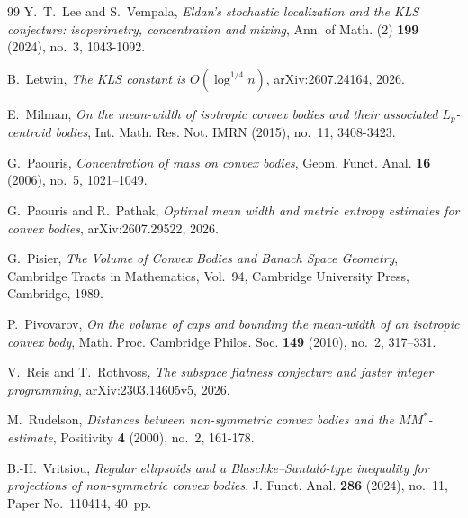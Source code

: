 \documentclass[12pt]{article}
\theoremstyle{definition}
\theoremstyle{remark}
\begin{document}
\begin{thebibliography}{99}
Y.~T.~Lee and S.~Vempala,
\emph{Eldan's stochastic localization and the KLS conjecture: isoperimetry, concentration and mixing},
Ann. of Math. (2) \textbf{199} (2024), no.~3, 1043-1092.

B.~Letwin,
\emph{The KLS constant is $O(\log^{1/4}n)$},
arXiv:2607.24164, 2026.

E.~Milman,
\emph{On the mean-width of isotropic convex bodies and their associated $L_p$-centroid bodies},
Int. Math. Res. Not. IMRN (2015), no.~11, 3408-3423.

G.~Paouris,
\emph{Concentration of mass on convex bodies},
Geom. Funct. Anal. \textbf{16} (2006), no.~5, 1021--1049.

G.~Paouris and R.~Pathak,
\emph{Optimal mean width and metric entropy estimates for convex
bodies},
arXiv:2607.29522, 2026.

G.~Pisier,
\emph{The Volume of Convex Bodies and Banach Space Geometry},
Cambridge Tracts in Mathematics, Vol.~94,
Cambridge University Press, Cambridge, 1989.

P.~Pivovarov,
\emph{On the volume of caps and bounding the mean-width of an
isotropic convex body},
Math. Proc. Cambridge Philos. Soc. \textbf{149} (2010), no.~2,
317--331.

V.~Reis and T.~Rothvoss,
\emph{The subspace flatness conjecture and faster integer programming},
arXiv:2303.14605v5, 2026.

M.~Rudelson,
\emph{Distances between non-symmetric convex bodies and the $MM^*$-estimate},
Positivity \textbf{4} (2000), no.~2, 161-178.

B.-H.~Vritsiou,
\emph{Regular ellipsoids and a Blaschke--Santal\'o-type inequality
for projections of non-symmetric convex bodies},
J. Funct. Anal. \textbf{286} (2024), no.~11,
Paper No.~110414, 40~pp.

\end{thebibliography}
\end{document}
